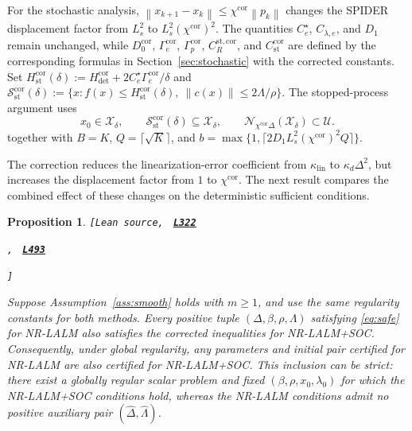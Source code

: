 \documentclass[11pt]{article}
\newtheorem{proposition}[theorem]{Proposition}
\theoremstyle{definition}
\theoremstyle{remark}
\numberwithin{equation}{section}
\numberwithin{figure}{section}
\numberwithin{table}{section}
\numberwithin{algorithm}{section}
\newcommand{\norm}[1]{\left\lVert #1\right\rVert}
\newcommand{\leanLinkText}[1]{%
  \underline{\textbf{#1}}%
}
\newcommand{\leanDeclTag}[2]{%
  {\footnotesize\texttt{[Lean source, }}%
  \href{https://github.com/optpku/ReasBook/blob/v4.32.2/ReasBook/Papers/TR_LALM_theory/#1?plain=1\#L#2}%
    {\leanLinkText{\footnotesize\texttt{L#2}}}%
}
\newcommand{\leanDeclTagExtra}[2]{%
  \unskip
  {\footnotesize\texttt{, }}%
  \href{https://github.com/optpku/ReasBook/blob/v4.32.2/ReasBook/Papers/TR_LALM_theory/#1?plain=1\#L#2}%
    {\leanLinkText{\footnotesize\texttt{L#2}}}\allowbreak
}
\newcommand{\leanDeclTagEnd}{%
  \unskip
  {\footnotesize\texttt{]}}\enspace
}
\begin{document}
For the stochastic analysis,
$\norm{x_{k+1}-x_k}\le\chi^{\mathrm{cor}}\norm{p_k}$ changes the SPIDER
displacement factor from $L_s^2$ to
$L_s^2(\chi^{\mathrm{cor}})^2$.  The quantities
$C_e^\star$, $C_{\lambda,e}$, and $D_1$ remain unchanged, while
$D_0^{\mathrm{cor}}$, $\Gamma_e^{\mathrm{cor}}$,
$\Gamma_p^{\mathrm{cor}}$, $C_R^{\mathrm{st,cor}}$, and
$C_{\mathrm{st}}^{\mathrm{cor}}$ are defined by the corresponding formulas
in Section~\ref{sec:stochastic} with the corrected constants.  Set
$H_{\mathrm{st}}^{\mathrm{cor}}(\delta)
:=H_{\mathrm{det}}^{\mathrm{cor}}
+2C_e^\star\Gamma_e^{\mathrm{cor}}/\delta$ and
$\mathcal S_{\mathrm{st}}^{\mathrm{cor}}(\delta)
:=\{x:f(x)\le H_{\mathrm{st}}^{\mathrm{cor}}(\delta),
\ \norm{c(x)}\le2\Lambda/\rho\}$.  The stopped-process argument uses
\begin{equation}
 x_0\in\mathcal X_\delta,
 \qquad
 \mathcal S_{\mathrm{st}}^{\mathrm{cor}}(\delta)
 \subseteq\mathcal X_\delta,
 \qquad
 \mathcal N_{\chi^{\mathrm{cor}}\Delta}(\mathcal X_\delta)
 \subset\mathcal U.
\label{eq:corrected-stoch-buffer}
\end{equation}
together with $B=K$, $Q=\lceil\sqrt K\rceil$, and
$b=\max\{1,\lceil2D_1L_s^2(\chi^{\mathrm{cor}})^2Q\rceil\}$.

The correction reduces the linearization-error coefficient from
$\kappa_{\mathrm{lin}}$ to $\kappa_d\Delta^2$, but increases the displacement factor from $1$ to $\chi^{\mathrm{cor}}$.  The next result compares the combined effect of these changes on the deterministic sufficient conditions.

\begin{proposition}
\label{prop:parameter-region}
\leanDeclTag{Proposition_4_1.lean}{322}
\leanDeclTagExtra{Proposition_4_1.lean}{493}
\leanDeclTagEnd
Suppose Assumption~\ref{ass:smooth} holds with \(m\ge1\), and use the same regularity constants for both methods.  Every positive tuple \((\Delta,\beta,\rho,\Lambda)\) satisfying \eqref{eq:safe} for NR-LALM also satisfies the corrected inequalities for NR-LALM+SOC.  Consequently, under global regularity, any parameters and initial pair certified for NR-LALM are also certified for NR-LALM+SOC.  This inclusion can be strict: there exist a globally regular scalar problem and fixed \((\beta,\rho,x_0,\lambda_0)\) for which the NR-LALM+SOC conditions hold, whereas the NR-LALM conditions admit no positive auxiliary pair
\((\widehat\Delta,\widehat\Lambda)\).
\end{proposition}
\end{document}
